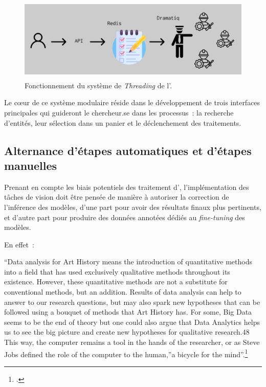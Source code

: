 \begin{figure}[H]
          \begin{center}
          \includegraphics[height=4cm]{figues/dramatiq.png}
          \end{center}
          \caption{Fonctionnement du système de \textit{Threading} de l'\api.}
          \label{fig:dramatiq} \end{figure}

Le cœur de ce système modulaire réside dans le développement de trois
interfaces principales qui guideront le chercheur.se dans les processus~:
la recherche d'entités, leur sélection dans un panier et le
déclenchement des traitements.

\hypertarget{alternance-detapes-automatiques-et-detapes-manuelles}{%
\subsection{Alternance d'étapes automatiques et d'étapes
manuelles}\label{alternance-detapes-automatiques-et-detapes-manuelles}}

Prenant en compte les biais potentiels des traitement d'\ia,
l'implémentation des tâches de vision doit être pensée de manière à
autoriser la correction de l'inférence des modèles, d'une part pour
avoir des résultats finaux plus pertinents, et d'autre part pour
produire des données annotées dédiés au \emph{fine-tuning} des modèles.

En effet~:

\begin{kwote}
``Data analysis for Art History means the introduction of quantitative
methods into a field that has used exclusively qualitative methods
throughout its existence. However, these quantitative methods are not a
substitute for conventional methods, but an addition. Results of data
analysis can help to answer to our research questions, but may also
spark new hypotheses that can be followed using a bouquet of methods
that Art History has. For some, Big Data seems to be the end of theory
but one could also argue that Data Analytics helps us to see the big
picture and create new hypotheses for qualitative research.48 This way,
the computer remains a tool in the hands of the researcher, or as Steve
Jobs defined the role of the computer to the human,''a bicycle for the
mind''.\footcite[p.28]{klinke_big_2016}
\end{kwote}

